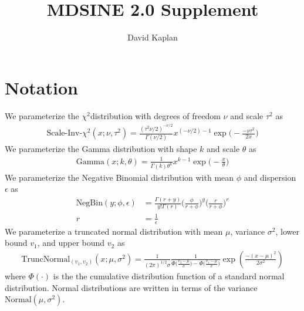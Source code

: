 \documentclass{article}
\title{MDSINE 2.0 Supplement}
\author{David Kaplan}
\newcommand{\Normaldist}{\text{Normal}}
\newcommand{\Gammadist}{\text{Gamma}}
\newcommand{\ScaledInvChiSquaredTdist}{\text{Scale-Inv-}$\chi^2$} %
\newcommand{\ScaledInvChiSquareddist}{\text{Scale-Inv-}\chi^2}
\newcommand{\NegBindist}{\text{NegBin}}
\newcommand{\TruncNormaldist}[2]{\text{TruncNormal}_{(#1, #2)}}
\begin{document}
\maketitle
\tableofcontents
\newpage

\section{Notation}
\label{section:Notation}

We parameterize the \ScaledInvChiSquaredTdist distribution with degrees of freedom $\nu$ and scale $\tau^2$ as
\begin{align}
    \label{eqn:ScaledInvChiSquareddist}
    \ScaledInvChiSquareddist (x ; \nu, \tau^2) = 
        \frac{(\tau^2\nu/2)^{-\nu/2}}{\Gamma(\nu/2)} 
        x ^ {(-\nu/2)-1}
        \exp \Big( -\frac{-\nu \tau^2}{2x} \Big )
\end{align}
We parameterize the Gamma distribution with shape $k$ and scale $\theta$ as
\begin{align}
    \label{eqn:Gammadist}
    \Gammadist(x ; k, \theta) =
        \frac{1}{\Gamma(k)\theta^k} x^{k-1}
        \exp{\Big( -\frac{x}{\theta} \Big)}
\end{align}
We parameterize the Negative Binomial distribution with mean $\phi$ and dispersion $\epsilon$ as
\begin{align}
    \label{eqn:NegBindist}
    \NegBindist(y;\phi,\epsilon) & =
        \frac{\Gamma(r+y)}{y!\Gamma(r)}
        \Big(
            \frac{\phi}{r+\phi}
        \Big)^y
        \Big(
            \frac{r}{r+\phi}
        \Big)^r \\
    r & = \frac{1}{\epsilon}
\end{align}
We parameterize a truncated normal distribution with mean $\mu$, variance $\sigma^2$, lower bound $v_1$, and upper bound $v_2$ as
\begin{align}
    \TruncNormaldist{v_1}{v_2}(x ; \mu , \sigma^2) = 
        \frac{1}{(2 \pi)^{1/2} \sigma} 
        \frac{1}{
            \Phi \Big( \frac{v_2 - \mu}{\sigma} \Big) -
            \Phi \Big( \frac{v_1 - \mu}{\sigma} \Big)}
        \exp \left( \frac{- (x - \mu)^2}{2 \sigma^2}
        \right)
\end{align}
where $\Phi (\cdot)$ is the the cumulative distribution function of a standard normal distribution. Normal distributions are written in terms of the variance $\Normaldist(\mu, \sigma^2)$.

\end{document}
